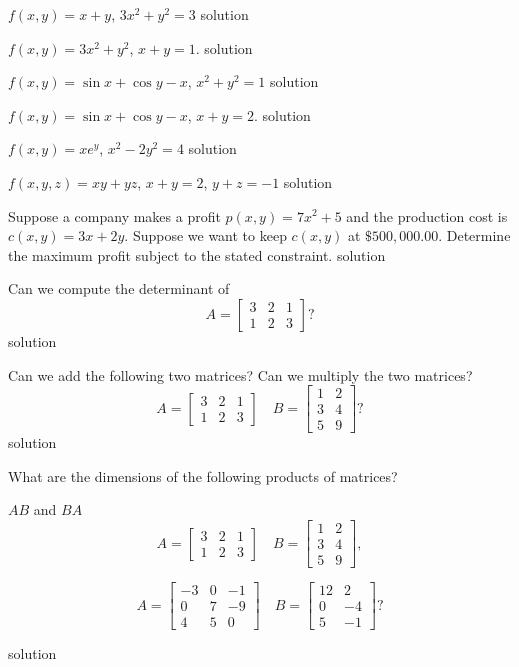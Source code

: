 \documentclass{amsart}
\begin{document}
	
{
$f(x,y) = x+y$, $3x^2+y^2 = 3$
}
{
solution
}

{
$f(x,y) = 3x^2 +y^2$, $x+y = 1$.  
}
{
solution
}

{
$f(x,y) = \sin x+ \cos y - x$, $x^2+y^2 = 1$
}
{
solution
}

{
$f(x,y) = \sin x+ \cos y  - x$, $x+y = 2$.  
}
{
solution
}

{
$f(x,y) = xe^y$, $x^2 - 2y^2 = 4$
}
{
solution
}

{
$f(x,y,z) = xy +yz$, $x+y = 2$, $y+z = -1$
}
{
solution
}

{
Suppose a company makes a profit $p(x,y) = 7x^2+ 5$ and the production cost is $c(x,y) = 3x+2y$.  Suppose we want to keep $c(x,y)$ at $\$500, 000.00$.  Determine the maximum profit subject to the stated constraint.
}
{
solution
}

{
Can we compute the determinant of 
\[A = 
\begin{bmatrix}
	3 & 2 & 1\\
	1 & 2 & 3
\end{bmatrix}?
\]
}
{
solution
}

{
Can we add the following two matrices? Can we multiply the two matrices?
\[A = 
\begin{bmatrix}
	3 & 2 & 1\\
	1 & 2 & 3
\end{bmatrix}
\quad 
B = 
\begin{bmatrix}
 1 & 2\\
 3 & 4\\
 5 & 9
\end{bmatrix}?
\]
}
{
solution
}

{
What are the dimensions of the following products of matrices?

$AB$ and $BA$ 
\[ A = 
\begin{bmatrix}
	3 & 2 & 1\\
	1 & 2 & 3
\end{bmatrix}
\quad 
B = 
\begin{bmatrix}
 1 & 2\\
 3 & 4\\
 5 & 9
\end{bmatrix},
\]

\[A = 
\begin{bmatrix}
	-3 & 0 & -1\\
	0 & 7 & -9\\
	4 & 5 & 0
\end{bmatrix}
\quad 
B = 
\begin{bmatrix}
 12 & 2\\
 0 & -4\\
 5 & -1
\end{bmatrix}?
\]


}
{
solution
}
\end{document}

